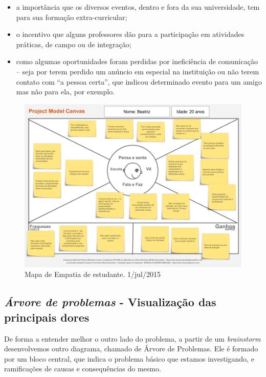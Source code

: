 \documentclass[12pt,a4paper,twoside,hyphens,english,brazil]{abntex2}
\newcommand{\conf}{{\color{OliveGreen}\framebox[1.1\width]{CNF}}}
\begin{document}
\begin{itemize}[itemsep=-1ex]
	\item  a importância que os diversos eventos, dentro e fora da sua universidade, tem para sua formação extra-curricular;
	\item  o incentivo que alguns professores dão para a participação em atividades práticas, de campo ou de integração;
	\item  como algumas oportunidades foram perdidas por ineficiência de comunicação -- seja por terem perdido um anúncio em especial na instituição ou não terem contato com ``a pessoa certa'', que indicou determinado evento para um amigo mas não para ela, por exemplo.
\end{itemize}

\begin{figure}[!h]
	\centering
	\includegraphics[width=1\linewidth]{diagramas/mapa-de-empatia.png}
	\caption{Mapa de Empatia de estudante. 1/jul/2015}
	\label{diag:empatia}
\end{figure}


\subsection{\emph{Árvore de problemas} - Visualização das principais dores}
De forma a entender melhor o outro lado do problema, a partir de um \emph{brainstorm} desenvolvemos outro diagrama, chamado de Árvore de Problemas. Ele é formado por um bloco central, que indica o problema básico que estamos investigando, e ramificações de causas e consequências do mesmo.\cite{arvore-de-problemas-portal-educacao}
\end{document}
